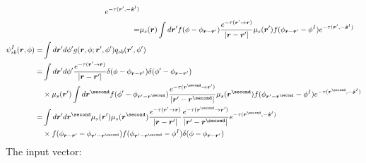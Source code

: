 \documentclass [10pt,letterpaper]{article}
\renewcommand{\vec}{\vectorsym}
\newcommand{\unitvec}[1]{\hat{\vec{#1}}}
\begin{document}
\begin{subequations}
\begin{align}
\begin{split}
			e^{-\tau(\vec{r}^\prime,-\unitvec{s}^I)} 
			\\
			=& 
			\mu_s(\vec{r})
			\int d\vec{r}^\prime
			f(\phi-\phi_{\vec{r}-\vec{r}^\prime})
			\frac
			{e^{-\tau(\vec{r}^\prime\to\vec{r})}}
			{\lvert \vec{r}-\vec{r}^\prime \rvert}
			\mu_s(\vec{r}^\prime)
			f(\phi_{\vec{r}-\vec{r}^\prime}-\phi^I)
			e^{-\tau(\vec{r}^\prime,-\unitvec{s}^I)} 
		\end{split}
		\label{eq:result-qsb-2d}
			\\
		\begin{split}
			\psi_{sb}^I(\vec{r},\phi)
			=&
			\int d\vec{r}^\prime d\phi^\prime
			g(\vec{r},\phi;\vec{r}^\prime,\phi^\prime)
			q_{sb}(\vec{r}^\prime,\phi^\prime)
			\\
			=& 
			\int d\vec{r}^\prime d\phi^\prime
			\frac
			{e^{-\tau(\vec{r}^\prime\to\vec{r})}}
			{\lvert \vec{r}-\vec{r}^\prime \rvert}
			\delta(\phi-\phi_{\vec{r}-\vec{r}^\prime})
			\delta(\phi^\prime-\phi_{\vec{r}-\vec{r}^\prime})
			\\
			&
			\times
			\mu_s(\vec{r}^\prime)
			\int d\vec{r}^\second
			f(\phi^\prime-\phi_{\vec{r}^\prime-\vec{r}^\second})
			\frac
			{e^{-\tau(\vec{r}^\second\to\vec{r}^\prime)}}
			{\lvert \vec{r}^\prime-\vec{r}^\second \rvert}
			\mu_s(\vec{r}^\second)
			f(\phi_{\vec{r}^\prime-\vec{r}^\second}-\phi^I)
			e^{-\tau(\vec{r}^\second,-\unitvec{s}^I)} 
			\\
			=& 
			\int d\vec{r}^\prime d\vec{r}^\second
			\mu_s(\vec{r}^\prime)
			\mu_s(\vec{r}^\second)
			\frac
			{e^{-\tau(\vec{r}^\prime\to\vec{r})}}
			{\lvert \vec{r}-\vec{r}^\prime \rvert}
			\frac
			{e^{-\tau(\vec{r}^\second\to\vec{r}^\prime)}}
			{\lvert \vec{r}^\prime-\vec{r}^\second \rvert}
			e^{-\tau(\vec{r}^\second,-\unitvec{s}^I)} 
			\\
			&
			\times
			f(\phi_{\vec{r}-\vec{r}^\prime}-\phi_{\vec{r}^\prime-\vec{r}^\second})
			f(\phi_{\vec{r}^\prime-\vec{r}^\second}-\phi^I)
			\delta(\phi-\phi_{\vec{r}-\vec{r}^\prime})
		\end{split}
		\label{eq:result-psisbI-2d}
	\end{align}
\end{subequations}
The input vector:
\end{document}
